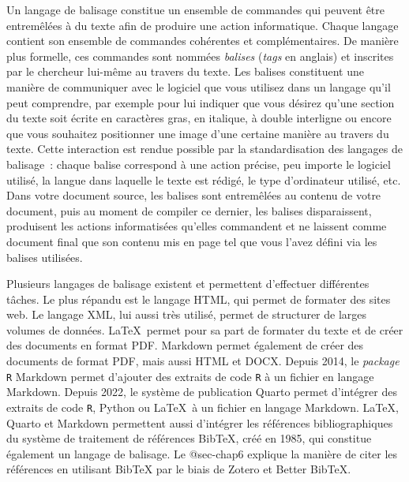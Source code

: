 \documentclass[
  letterpaper,
]{scrbook}
\begin{document}
Un langage de balisage constitue un ensemble de commandes qui peuvent
être entremêlées à du texte afin de produire une action informatique.
Chaque langage contient son ensemble de commandes cohérentes et
complémentaires. De manière plus formelle, ces commandes sont nommées
\emph{balises} (\emph{tags} en anglais) et inscrites par le chercheur
lui-même au travers du texte. Les balises constituent une manière de
communiquer avec le logiciel que vous utilisez dans un langage qu'il
peut comprendre, par exemple pour lui indiquer que vous désirez qu'une
section du texte soit écrite en caractères gras, en italique, à double
interligne ou encore que vous souhaitez positionner une image d'une
certaine manière au travers du texte. Cette interaction est rendue
possible par la standardisation des langages de balisage~: chaque balise
correspond à une action précise, peu importe le logiciel utilisé, la
langue dans laquelle le texte est rédigé, le type d'ordinateur utilisé,
etc. Dans votre document source, les balises sont entremêlées au contenu
de votre document, puis au moment de compiler ce dernier, les balises
disparaissent, produisent les actions informatisées qu'elles commandent
et ne laissent comme document final que son contenu mis en page tel que
vous l'avez défini via les balises utilisées.

Plusieurs langages de balisage existent et permettent d'effectuer
différentes tâches. Le plus répandu est le langage HTML, qui permet de
formater des sites web. Le langage XML, lui aussi très utilisé, permet
de structurer de larges volumes de données. \LaTeX~permet pour sa part
de formater du texte et de créer des documents en format PDF. Markdown
permet également de créer des documents de format PDF, mais aussi HTML
et DOCX. Depuis 2014, le \emph{package} \texttt{R} Markdown permet
d'ajouter des extraits de code \texttt{R} à un fichier en langage
Markdown. Depuis 2022, le système de publication Quarto permet
d'intégrer des extraits de code \texttt{R}, Python ou \LaTeX~à un
fichier en langage Markdown. \LaTeX, Quarto et Markdown permettent aussi
d'intégrer les références bibliographiques du système de traitement de
références BibTeX, créé en 1985, qui constitue également un langage de
balisage. Le @sec-chap6 explique la manière de citer les références en
utilisant BibTeX par le biais de Zotero et Better BibTeX.
\end{document}

